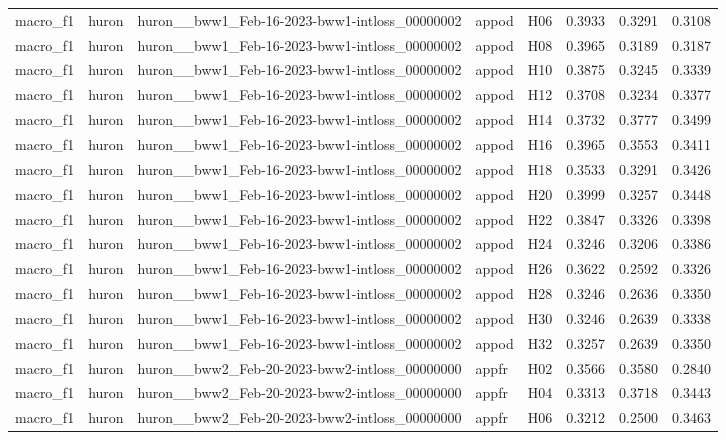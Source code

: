 \begin{table}[tbp]
\begin{tabular}{lllllrrr}
macro\_f1 & huron & huron\_\_bww1\_Feb-16-2023-bww1-intloss\_00000002 & appod & H06 & 0.3933 & 0.3291 & 0.3108 \\
macro\_f1 & huron & huron\_\_bww1\_Feb-16-2023-bww1-intloss\_00000002 & appod & H08 & 0.3965 & 0.3189 & 0.3187 \\
macro\_f1 & huron & huron\_\_bww1\_Feb-16-2023-bww1-intloss\_00000002 & appod & H10 & 0.3875 & 0.3245 & 0.3339 \\
macro\_f1 & huron & huron\_\_bww1\_Feb-16-2023-bww1-intloss\_00000002 & appod & H12 & 0.3708 & 0.3234 & 0.3377 \\
macro\_f1 & huron & huron\_\_bww1\_Feb-16-2023-bww1-intloss\_00000002 & appod & H14 & 0.3732 & 0.3777 & 0.3499 \\
macro\_f1 & huron & huron\_\_bww1\_Feb-16-2023-bww1-intloss\_00000002 & appod & H16 & 0.3965 & 0.3553 & 0.3411 \\
macro\_f1 & huron & huron\_\_bww1\_Feb-16-2023-bww1-intloss\_00000002 & appod & H18 & 0.3533 & 0.3291 & 0.3426 \\
macro\_f1 & huron & huron\_\_bww1\_Feb-16-2023-bww1-intloss\_00000002 & appod & H20 & 0.3999 & 0.3257 & 0.3448 \\
macro\_f1 & huron & huron\_\_bww1\_Feb-16-2023-bww1-intloss\_00000002 & appod & H22 & 0.3847 & 0.3326 & 0.3398 \\
macro\_f1 & huron & huron\_\_bww1\_Feb-16-2023-bww1-intloss\_00000002 & appod & H24 & 0.3246 & 0.3206 & 0.3386 \\
macro\_f1 & huron & huron\_\_bww1\_Feb-16-2023-bww1-intloss\_00000002 & appod & H26 & 0.3622 & 0.2592 & 0.3326 \\
macro\_f1 & huron & huron\_\_bww1\_Feb-16-2023-bww1-intloss\_00000002 & appod & H28 & 0.3246 & 0.2636 & 0.3350 \\
macro\_f1 & huron & huron\_\_bww1\_Feb-16-2023-bww1-intloss\_00000002 & appod & H30 & 0.3246 & 0.2639 & 0.3338 \\
macro\_f1 & huron & huron\_\_bww1\_Feb-16-2023-bww1-intloss\_00000002 & appod & H32 & 0.3257 & 0.2639 & 0.3350 \\
macro\_f1 & huron & huron\_\_bww2\_Feb-20-2023-bww2-intloss\_00000000 & appfr & H02 & 0.3566 & 0.3580 & 0.2840 \\
macro\_f1 & huron & huron\_\_bww2\_Feb-20-2023-bww2-intloss\_00000000 & appfr & H04 & 0.3313 & 0.3718 & 0.3443 \\
macro\_f1 & huron & huron\_\_bww2\_Feb-20-2023-bww2-intloss\_00000000 & appfr & H06 & 0.3212 & 0.2500 & 0.3463 \\

\end{tabular}
\end{table}
